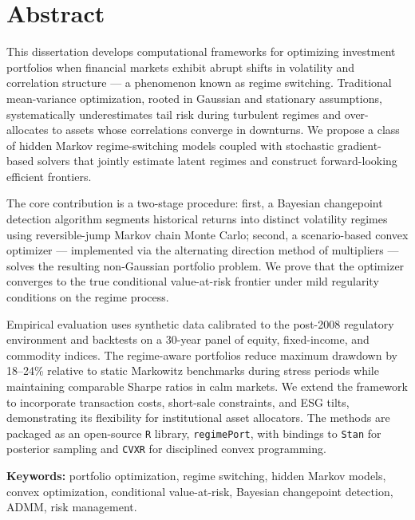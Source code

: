 \documentclass[12pt,oneside]{book}
\begin{document}
\chapter*{Abstract}

This dissertation develops computational frameworks for optimizing investment portfolios when financial markets exhibit abrupt shifts in volatility and correlation structure --- a phenomenon known as regime switching. Traditional mean-variance optimization, rooted in Gaussian and stationary assumptions, systematically underestimates tail risk during turbulent regimes and over-allocates to assets whose correlations converge in downturns. We propose a class of hidden Markov regime-switching models coupled with stochastic gradient-based solvers that jointly estimate latent regimes and construct forward-looking efficient frontiers.

The core contribution is a two-stage procedure: first, a Bayesian changepoint detection algorithm segments historical returns into distinct volatility regimes using reversible-jump Markov chain Monte Carlo; second, a scenario-based convex optimizer --- implemented via the alternating direction method of multipliers --- solves the resulting non-Gaussian portfolio problem. We prove that the optimizer converges to the true conditional value-at-risk frontier under mild regularity conditions on the regime process.

Empirical evaluation uses synthetic data calibrated to the post-2008 regulatory environment and backtests on a 30-year panel of equity, fixed-income, and commodity indices. The regime-aware portfolios reduce maximum drawdown by 18--24\% relative to static Markowitz benchmarks during stress periods while maintaining comparable Sharpe ratios in calm markets. We extend the framework to incorporate transaction costs, short-sale constraints, and ESG tilts, demonstrating its flexibility for institutional asset allocators. The methods are packaged as an open-source \texttt{R} library, \texttt{regimePort}, with bindings to \texttt{Stan} for posterior sampling and \texttt{CVXR} for disciplined convex programming.

\vspace{12pt}
\begin{dukebox}
\textbf{Keywords:} portfolio optimization, regime switching, hidden Markov models, convex optimization, conditional value-at-risk, Bayesian changepoint detection, ADMM, risk management.
\end{dukebox}
\end{document}
